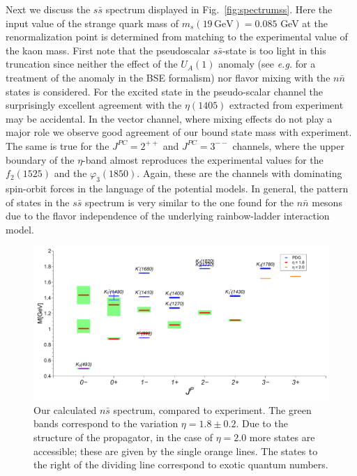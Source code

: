 Next we discuss the $s\bar{s}$ spectrum displayed in Fig.~\ref{fig:spectrumss}.
Here the input value of the strange quark mass of $m_s(19 \,\mbox{GeV}) = 0.085$ GeV at the renormalization
point is determined from matching to the experimental value of the kaon mass.
First note that the pseudoscalar $s\bar{s}$-state is too light in this truncation since neither the 
effect of the $U_A(1)$ anomaly (see {\it e.g.} \cite{Alkofer:2008et} for a treatment of the anomaly
in the BSE formalism) nor flavor mixing with the $n\bar{n}$ states is considered. For the excited 
state in the pseudo-scalar channel the surprisingly excellent agreement with the $\eta(1405)$ extracted from
experiment may be accidental. In the vector channel, where mixing effects do not play a major role we
observe good agreement of our bound state mass with experiment. The same is true for the $J^{PC}=2^{++}$
and $J^{PC}=3^{--}$ channels, where the upper boundary of the $\eta$-band almost reproduces the
experimental values for the $f_2(1525)$ and the $\varphi_3(1850)$. Again, these are the channels
with dominating spin-orbit forces in the language of the potential models. In general, the pattern of
states in the $s\bar{s}$ spectrum is very similar to the one found for the $n\bar{n}$ mesons due
to the flavor independence of the underlying rainbow-ladder interaction model. 
\begin{figure}[t]
\begin{center}
\includegraphics[width=0.999\textwidth]{figures/spectrum_ns}
\caption{\footnotesize Our calculated $n\bar{s}$ spectrum, compared to experiment. The green bands 
correspond to the variation $\eta=1.8\pm0.2$. Due to the structure of the propagator, in the case 
of $\eta=2.0$ more states are accessible; these are given by the single orange lines. The states 
to the right of the dividing line correspond to exotic quantum numbers.
 }\label{fig:spectrumns}
\end{center}
\end{figure} \\

